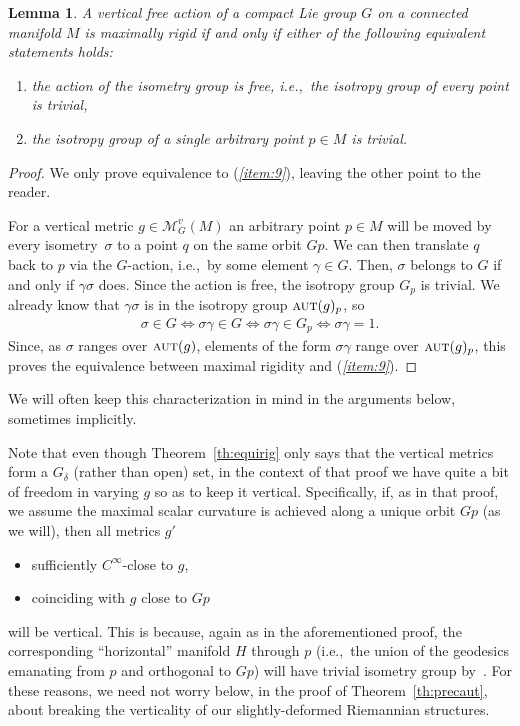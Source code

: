 \documentclass[pdftex]{sigma}%
\numberwithin{equation}{section}
\newtheorem{Lemma}[Theorem]{Lemma}
\newcommand{\cat}[1]{\textsc{#1}}
\begin{document}
\begin{Lemma}\label{le:charmax}
 A vertical free action of a compact Lie group $G$ on a connected manifold $M$ is maximally rigid if and only if either of the following equivalent statements holds:
 \begin{enumerate}[$(a)$]\itemsep=0pt
 \item%
 the action of the isometry group is free, i.e.,~the isotropy group of every point is trivial,
 \item\label{item:9}
 the isotropy group of a {\it single} arbitrary point $p\in M$ is trivial.
 \end{enumerate}
\end{Lemma}
\begin{proof}
 We only prove equivalence to ({\it \ref{item:9}}), leaving the other point to the reader.

 For a vertical metric $g\in \mathcal{M}_G^v(M)$ an arbitrary point $p\in M$ will be moved by every isometry~$\sigma$ to a point $q$ on the same orbit $Gp$. We can then translate $q$ back to $p$ via the $G$-action, i.e.,~by some element $\gamma\in G$. Then, $\sigma$ belongs to $G$ if and only if $\gamma\sigma$ does. Since the action is free, the isotropy group $G_p$ is trivial. We already know that $\gamma\sigma$ is in the isotropy group $\cat{aut}(g)_p$, so
 \begin{gather*}
 \sigma\in G\iff \sigma\gamma\in G\iff \sigma\gamma\in G_p\iff \sigma\gamma=1.
 \end{gather*}
 Since, as $\sigma$ ranges over $\cat{aut}(g)$, elements of the form $\sigma\gamma$ range over $\cat{aut}(g)_p$, this proves the equivalence between maximal rigidity and ({\it \ref{item:9}}).
\end{proof}

We will often keep this characterization in mind in the arguments below, sometimes implicitly.

Note that even though Theorem~\ref{th:equirig} only says that the vertical metrics form a $G_{\delta}$ (rather than open) set, in the context of that proof we have quite a bit of freedom in varying $g$ so as to keep it vertical. Specifically, if, as in that proof, we assume the maximal scalar curvature is achieved along a unique orbit $Gp$ (as we will), then all metrics $g'$
\begin{itemize}\itemsep=0pt
\item sufficiently $C^{\infty}$-close to $g$,
\item coinciding with $g$ close to $Gp$
\end{itemize}
will be vertical. This is because, again as in the aforementioned proof, the corresponding ``horizontal'' manifold $H$ through $p$ (i.e.,~the union of the geodesics emanating from $p$ and orthogonal to $Gp$) will have trivial isometry group by~\cite[Proposition~8.3]{eb}. For these reasons, we need not worry below, in the proof of Theorem~\ref{th:precaut}, about breaking the verticality of our slightly-deformed Riemannian structures.
\end{document}
